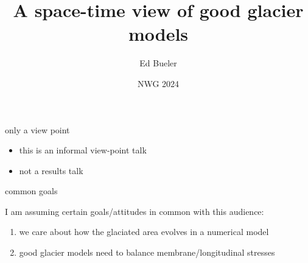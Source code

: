 \documentclass[10pt,dvipsnames]{beamer}
\title{A space-time view of good glacier models}
\date{NWG 2024}
\author{Ed Bueler}
\institute{University of Alaska Fairbanks}
\begin{document}
\graphicspath{{figs/}}

\maketitle





\begin{frame}{only a view point}

\begin{itemize}
\item this is an informal view-point talk
\item not a results talk
\end{itemize}
\end{frame}


\begin{frame}{common goals}

I am assuming certain goals/attitudes in common with this audience:
\begin{enumerate}
\item we care about how the glaciated area evolves in a numerical model
\item good glacier models need to balance membrane/longitudinal stresses
\end{enumerate}
\end{frame}
\end{document}
